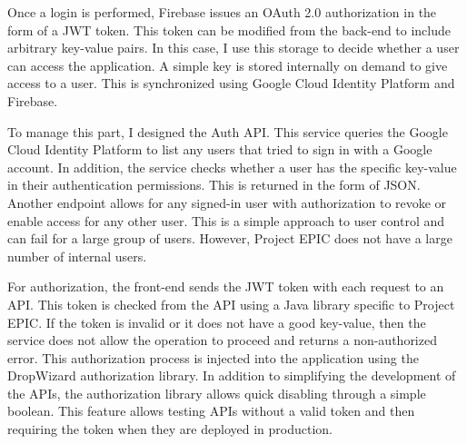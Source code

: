 Once a login is performed, Firebase issues an OAuth 2.0 authorization in the form of a JWT token. This token can be modified from the back-end to include arbitrary key-value pairs. In this case, I use this storage to decide whether a user can access the application. A simple key is stored internally on demand to give access to a user. This is synchronized using Google Cloud Identity Platform and Firebase. 

To manage this part, I designed the Auth API. This service queries the Google Cloud Identity Platform to list any users that tried to sign in with a Google account. In addition, the service checks whether a user has the specific key-value in their authentication permissions. This is returned in the form of JSON. Another endpoint allows for any signed-in user with authorization to revoke or enable access for any other user. This is a simple approach to user control and can fail for a large group of users. However, Project EPIC does not have a large number of internal users.

For authorization, the front-end sends the JWT token with each request to an API. This token is checked from the API using a Java library specific to Project EPIC. If the token is invalid or it does not have a good key-value, then the service does not allow the operation to proceed and returns a non-authorized error. This authorization process is injected into the application using the DropWizard authorization library. In addition to simplifying the development of the APIs, the authorization library allows quick disabling through a simple boolean. This feature allows testing APIs without a valid token and then requiring the token when they are deployed in production.


